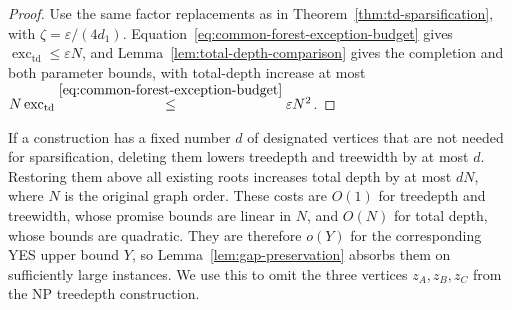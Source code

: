 \begin{proof}
Use the same factor replacements as in
Theorem~\ref{thm:td-sparsification}, with
$\zeta=\varepsilon/(4d_1)$. Equation~\eqref{eq:common-forest-exception-budget}
gives $\operatorname{exc}_{\mathrm{td}}\le\varepsilon N$, and
Lemma~\ref{lem:total-depth-comparison} gives the completion and both
parameter bounds, with total-depth increase at most
$N\operatorname{exc}_{\mathrm{td}}
\overset{\eqref{eq:common-forest-exception-budget}}{\leq}\varepsilon N^2$.
\end{proof}

If a construction has a fixed number $d$ of designated vertices
that are not needed for sparsification, deleting them lowers treedepth and treewidth by
at most $d$. Restoring them above all existing roots increases total
depth by at most $dN$, where $N$ is the original graph order.
These costs are $O(1)$ for treedepth and treewidth, whose promise
bounds are linear in $N$, and $O(N)$ for total depth, whose bounds
are quadratic. They are therefore $o(Y)$ for the corresponding YES
upper bound $Y$, so
Lemma~\ref{lem:gap-preservation} absorbs them on sufficiently large
instances. We use this to omit the three vertices
$z_A,z_B,z_C$ from the NP treedepth construction.
